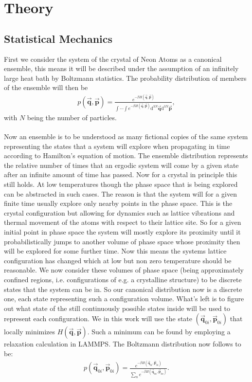 \chapter{Theory}
\label{chap:Theory}
%
\section{Statistical Mechanics}
First we consider the system of the crystal of Neon Atoms as a canonical ensemble, this means it will be described under the assumption of an infinitely large heat bath by Boltzmann statistics. The probability distribution of members of the ensemble will then be 
\begin{align}
	p(\vec{\mathbf{q}},\vec{\mathbf{p}})=\frac{e^{-\beta H(\vec{\mathbf{q}},\vec{\mathbf{p}})}}{\int\cdots\int e^{-\beta H(\vec{\mathbf{q}},\vec{\mathbf{p}})}\mathrm{d}^{3N}\vec{\mathbf{q}}\mathrm{d}^{3N}\vec{\mathbf{p}}},
\end{align}
with $N$ being the number of particles.\\\\
Now an ensemble is to be understood as many fictional copies of the same system representing the states that a system will explore when propagating in time according to Hamilton's equation of motion. The ensemble distribution represents the relative number of times that an ergodic system will come by a given state after an infinite amount of time has passed. Now for a crystal in principle this still holds. At low temperatures though the phase space that is being explored can be abstracted in such cases. The reason is that the system will for a given finite time usually explore only nearby points in the phase space. This is the crystal configuration but allowing for dynamics such as lattice vibrations and thermal movement of the atoms with respect to their lattice site. So for a given initial point in phase space the system will mostly explore its proximity until it probabilistically jumps to another volume of phase space whose proximity then will be explored for some further time. Now this means the systems lattice configuration has changed which at low but non zero temperature should be reasonable. 
We now consider these volumes of phase space (being approximately confined regions, i.e. configurations of e.g. a crystalline structure) to be discrete states that the system can be in. So our canonical distribution now is a discrete one, each state representing such a configuration volume. What's left is to figure out what state of the still continuously possible states inside will be used to represent each configuration. We in this work will use the state $(\vec{\mathbf{q}}_{0i},\vec{\mathbf{p}}_{0i})$ that locally minimizes $H(\vec{\mathbf{q}},\vec{\mathbf{p}})$. Such a minimum can be found by employing a relaxation calculation in \ac{LAMMPS}. The Boltzmann distribution now follows to be:
\begin{align}
	p(\vec{\mathbf{q}}_{0i},\vec{\mathbf{p}}_{0i})=\frac{e^{-\beta H(\vec{\mathbf{q}}_{0i},\vec{\mathbf{p}}_{0i})}}{\sum_{n} e^{-\beta H(\vec{\mathbf{q}}_{0n},\vec{\mathbf{p}}_{0n})}}.
\end{align}

